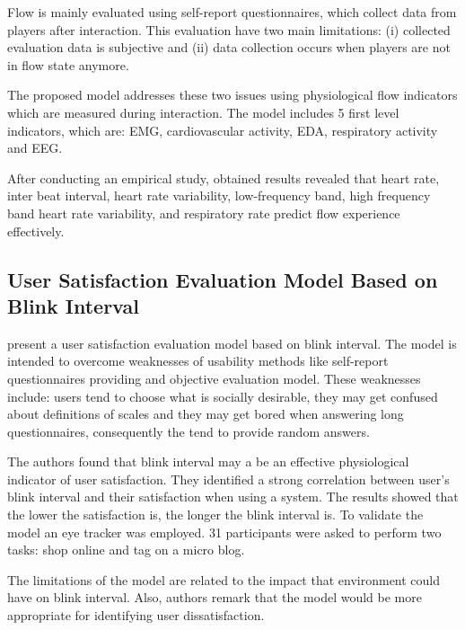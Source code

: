 Flow is mainly evaluated using self-report questionnaires, which collect data from players after interaction. This evaluation have two main  limitations: (i) collected evaluation data is subjective and (ii) data collection occurs when players are not in flow state anymore.

The proposed model addresses these two issues using physiological flow indicators which are measured during interaction. The model includes 5 first level indicators, which are: \ac{EMG}, cardiovascular activity, \ac{EDA}, respiratory activity and \ac{EEG}.

After conducting an empirical study, obtained results revealed that heart rate, inter beat interval, heart rate variability, low-frequency band, high frequency band heart rate variability, and respiratory rate predict flow experience effectively.

\subsection{User Satisfaction Evaluation Model Based on Blink Interval}

\textcite{hou2015} present a user satisfaction evaluation model based on blink interval. The model is intended to overcome weaknesses of usability methods like self-report questionnaires providing and objective evaluation model. These weaknesses include: users tend to choose what is socially desirable, they may get confused about definitions of scales and they may get bored when answering long questionnaires, consequently the tend to provide random answers.

The authors found that blink interval may a be an effective physiological indicator of user satisfaction. They identified a strong correlation between user's blink interval and their satisfaction when using a system. The results showed that the lower the satisfaction is, the longer the blink interval is. To validate the model an eye tracker was employed. 31 participants were asked to perform two tasks: shop online and tag on a micro blog.

The limitations of the model are related to the impact that environment could have on blink interval. Also, authors remark that the model would be more appropriate for identifying user dissatisfaction.

